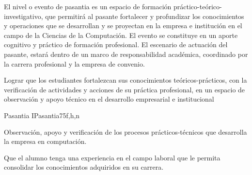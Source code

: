 \begin{syllabus}


\begin{justification}
El nivel o evento de pasantia es un espacio de formación práctico-teórico-investigativo, que permitirá al pasante fortalecer y profundizar los conocimientos y operaciones que se desarrollan y se proyectan en la empresa e institución en el campo de la Ciencias de la Computación. El evento se constituye en un aporte cognitivo y práctico de formación profesional. El escenario de actuación del pasante, estará dentro de un marco de responsabilidad académica, coordinado por la carrera profesional y la empresa de convenio.
\end{justification}

\begin{goals}
\item Lograr que los estudiantes fortalezcan sus conocimientos teóricos-prácticos, con la verificación de actividades y acciones de su práctica profesional, en un espacio de observación y apoyo técnico en el desarrollo empresarial e institucional  
\end{goals}

\begin{outcomes}
\end{outcomes}

\begin{unit}{Pasantia I}{Pasantia}{75}{f,h,n}
   \begin{topics}
      \item Observación, apoyo y verificación de los procesos prácticos-técnicos que desarrolla la empresa en computación.
   \end{topics}
   
   \begin{unitgoals}
      \item Que el alumno tenga una experiencia en el campo laboral que le permita consolidar los conocimientos adquiridos en su carrera.
   \end{unitgoals}
\end{unit}

\begin{coursebibliography}
\end{coursebibliography}

\end{syllabus}
